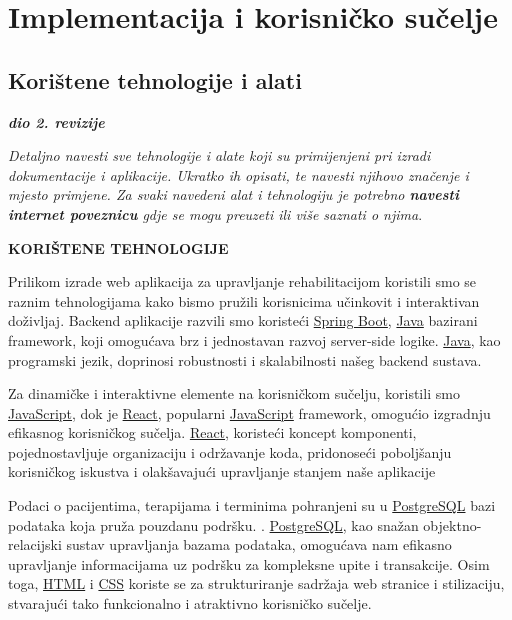 \chapter{Implementacija i korisničko sučelje}
		
		
		\section{Korištene tehnologije i alati}
		
			\textbf{\textit{dio 2. revizije}}
			
			 \textit{Detaljno navesti sve tehnologije i alate koji su primijenjeni pri izradi dokumentacije i aplikacije. Ukratko ih opisati, te navesti njihovo značenje i mjesto primjene. Za svaki navedeni alat i tehnologiju je potrebno \textbf{navesti internet poveznicu} gdje se mogu preuzeti ili više saznati o njima}.
			
\textbf{	KORIŠTENE TEHNOLOGIJE
} 

Prilikom izrade web aplikacija za upravljanje rehabilitacijom koristili smo se raznim tehnologijama kako bismo pružili korisnicima učinkovit i interaktivan doživljaj. Backend aplikacije razvili smo koristeći \href{https://www.spring.io/projects/spring-boot}{Spring Boot}, \href{https://www.oracle.com/java}{Java} bazirani framework, koji omogućava brz i jednostavan razvoj server-side logike. \href{https://www.oracle.com/java}{Java}, kao programski jezik, doprinosi robustnosti i skalabilnosti našeg backend sustava.

Za dinamičke i interaktivne elemente na korisničkom sučelju, koristili smo \href{https://www.developer.mozilla.org/en-US/docs/Web/JavaScript}{JavaScript}, dok je \href{https://www.reactjs.org}{React}, popularni \href{https://www.developer.mozilla.org/en-US/docs/Web/JavaScript}{JavaScript} framework, omogućio izgradnju efikasnog korisničkog sučelja. \href{https://www.reactjs.org}{React}, koristeći koncept komponenti, pojednostavljuje organizaciju i održavanje koda, pridonoseći poboljšanju korisničkog iskustva i olakšavajući upravljanje stanjem naše aplikacije 

Podaci o pacijentima, terapijama i terminima pohranjeni su u \href{https://www.postgresql.org}{PostgreSQL} bazi podataka koja pruža pouzdanu podršku. . \href{https://www.postgresql.org}{PostgreSQL}, kao snažan objektno-relacijski sustav upravljanja bazama podataka, omogućava nam efikasno upravljanje informacijama uz podršku za kompleksne upite i transakcije. Osim toga, \href{https://www.developer.mozilla.org/en-US/docs/Web/HTML}{HTML} i \href{https://www.developer.mozilla.org/en-US/docs/Web/CSS}{CSS} koriste se za strukturiranje sadržaja web stranice i stilizaciju, stvarajući tako funkcionalno i atraktivno korisničko sučelje.

